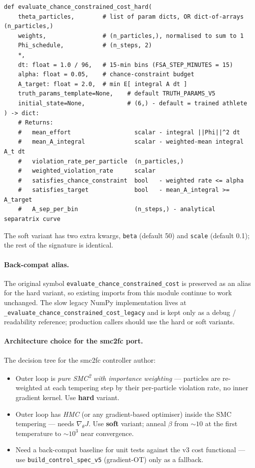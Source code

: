 \documentclass[11pt,a4paper]{article}
\theoremstyle{definition}
\begin{document}
\begin{lstlisting}
def evaluate_chance_constrained_cost_hard(
    theta_particles,        # list of param dicts, OR dict-of-arrays (n_particles,)
    weights,                # (n_particles,), normalised to sum to 1
    Phi_schedule,           # (n_steps, 2)
    *,
    dt: float = 1.0 / 96,   # 15-min bins (FSA_STEP_MINUTES = 15)
    alpha: float = 0.05,    # chance-constraint budget
    A_target: float = 2.0,  # min E[ integral A dt ]
    truth_params_template=None,    # default TRUTH_PARAMS_V5
    initial_state=None,            # (6,) - default = trained athlete
) -> dict:
    # Returns:
    #   mean_effort                  scalar - integral ||Phi||^2 dt
    #   mean_A_integral              scalar - weighted-mean integral A_t dt
    #   violation_rate_per_particle  (n_particles,)
    #   weighted_violation_rate      scalar
    #   satisfies_chance_constraint  bool   - weighted rate <= alpha
    #   satisfies_target             bool   - mean_A_integral >= A_target
    #   A_sep_per_bin                (n_steps,) - analytical separatrix curve
\end{lstlisting}

The soft variant has two extra kwargs, \texttt{beta} (default 50) and
\texttt{scale} (default 0.1); the rest of the signature is identical.

\paragraph{Back-compat alias.}
The original symbol
\texttt{evaluate\_chance\_constrained\_cost} is preserved as an alias
for the hard variant, so existing imports from this module continue to
work unchanged. The slow legacy NumPy implementation lives at
\texttt{\_evaluate\_chance\_constrained\_cost\_legacy} and is kept only
as a debug / readability reference; production callers should use the
hard or soft variants.

\paragraph{Architecture choice for the smc2fc port.}
The decision tree for the smc2fc controller author:
\begin{itemize}
  \item Outer loop is \emph{pure SMC\textsuperscript{2} with importance
        weighting} — particles are re-weighted at each tempering step
        by their per-particle violation rate, no inner gradient kernel.
        Use \textbf{hard} variant.
  \item Outer loop has \emph{HMC} (or any gradient-based optimiser)
        inside the SMC tempering — needs $\nabla_\theta J$. Use
        \textbf{soft} variant; anneal $\beta$ from $\sim 10$ at the
        first temperature to $\sim 10^3$ near convergence.
  \item Need a back-compat baseline for unit tests against the v3 cost
        functional — use \texttt{build\_control\_spec\_v5}
        (gradient-OT) only as a fallback.
\end{itemize}
\end{document}
